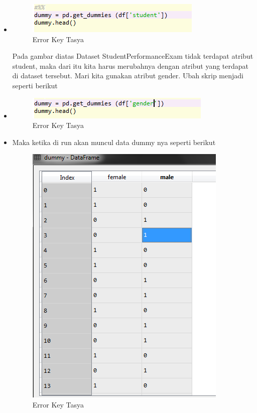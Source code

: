 \begin{itemize}
\item
\begin{figure}[ht]
\centering
\includegraphics[scale=0.5]{figures/praktektasyaeror2.png}
\caption{Error Key Tasya}
\label{Error}
\end{figure}
Pada gambar diatas Dataset StudentPerformanceExam tidak terdapat atribut student, maka dari itu kita harus merubahnya dengan atribut yang terdapat di dataset tersebut. Mari kita gunakan atribut gender. Ubah skrip menjadi seperti berikut
\item
\begin{figure}[ht]
\centering
\includegraphics[scale=0.5]{figures/praktektasyaeror3.png}
\caption{Error Key Tasya}
\label{Error}
\end{figure}
\item Maka ketika di run akan muncul data dummy nya seperti berikut
\begin{figure}[ht]
\centering
\includegraphics[scale=0.5]{figures/praktektasyaeror4.png}
\caption{Error Key Tasya}
\label{Error}
\end{figure}
\end{itemize}


